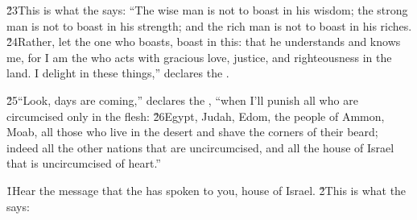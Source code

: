 \v{23}This is what the  says: ``The wise man is not to boast in his wisdom; the strong man is not to boast in his strength; and the rich man is not to boast in his riches. \v{24}Rather, let the one who boasts, boast in this: that he understands and knows me, for I am the  who acts with gracious love, justice, and righteousness in the land. I delight in these things,'' declares the .

\v{25}``Look, days are coming,'' declares the , ``when I'll punish all who are circumcised only in the flesh: \v{26}Egypt, Judah, Edom, the people of Ammon, Moab, all those who live in the desert and shave the corners of their beard; indeed all the other nations that are uncircumcised, and all the house of Israel that is uncircumcised of heart.''

\v{1}Hear the message that the  has spoken to you, house of Israel. \v{2}This is what the  says:

